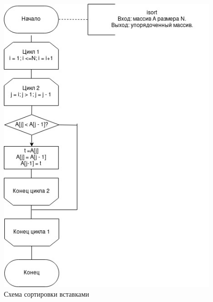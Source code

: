 \documentclass[12pt]{report}
\begin{document}
\begin{figure}[h]
	\centering
	\includegraphics[width=1\linewidth]{isort.jpg}
	\caption{Схема сортировки вставками}
	\label{fig:mpr}
\end{figure}
\end{document}
